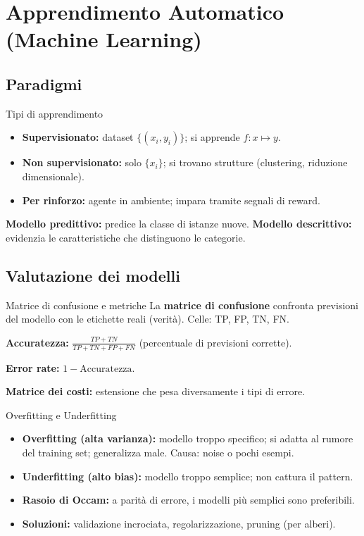 \documentclass[12pt,a4paper]{article}
\begin{document}
\section{Apprendimento Automatico (Machine Learning)}

\subsection{Paradigmi}

\begin{defbox}{Tipi di apprendimento}
\begin{itemize}[noitemsep]
  \item \textbf{Supervisionato:} dataset $\{(x_i, y_i)\}$; si apprende $f: x \mapsto y$.
  \item \textbf{Non supervisionato:} solo $\{x_i\}$; si trovano strutture (clustering, riduzione dimensionale).
  \item \textbf{Per rinforzo:} agente in ambiente; impara tramite segnali di reward.
\end{itemize}
\textbf{Modello predittivo:} predice la classe di istanze nuove. \textbf{Modello descrittivo:} evidenzia le caratteristiche che distinguono le categorie.
\end{defbox}

\subsection{Valutazione dei modelli}

\begin{defbox}{Matrice di confusione e metriche}
La \textbf{matrice di confusione} confronta previsioni del modello con le etichette reali (verità). Celle: TP, FP, TN, FN.

\textbf{Accuratezza:} $\frac{TP + TN}{TP + TN + FP + FN}$ (percentuale di previsioni corrette).

\textbf{Error rate:} $1 - \text{Accuratezza}$.

\textbf{Matrice dei costi:} estensione che pesa diversamente i tipi di errore.
\end{defbox}

\begin{warnbox}{Overfitting e Underfitting}
\begin{itemize}[noitemsep]
  \item \textbf{Overfitting (alta varianza):} modello troppo specifico; si adatta al rumore del training set; generalizza male. Causa: noise o pochi esempi.
  \item \textbf{Underfitting (alto bias):} modello troppo semplice; non cattura il pattern.
  \item \textbf{Rasoio di Occam:} a parità di errore, i modelli più semplici sono preferibili.
  \item \textbf{Soluzioni:} validazione incrociata, regolarizzazione, pruning (per alberi).
\end{itemize}
\end{warnbox}
\end{document}
